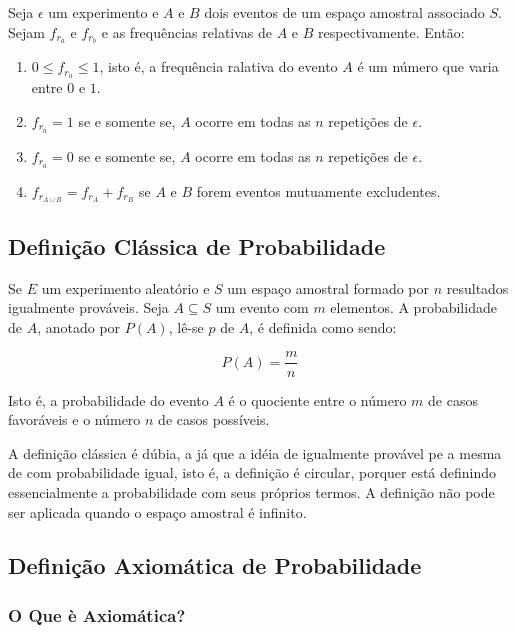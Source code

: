 \inic Seja $\epsilon$ um experimento e $A$ e $B$ dois eventos de um espaço amostral associado $S$. Sejam $f_{r}_{a}$ e $f_{r}_{b}$ e as frequências relativas de $A$ e $B$ respectivamente. Então:

\begin{enumerate}
    \item $0 \leqslant f_{r_{a}}  \leqslant 1$, isto é, a frequência ralativa do evento $A$ é um número que varia entre $0$ e $1$.
    \item $f_{r_{a}}= 1$ se e somente se, $A$ ocorre em todas as $n$ repetições de $\epsilon$.
    \item $f_{r_{a}}= 0$ se e somente se, $A$ ocorre em todas as $n$ repetições de $\epsilon$.
    \item $f_{r_{A \cup B}}  = f_{r_{A}} + f_{r_{B}}$ se $A$ e $B$ forem eventos mutuamente excludentes.
\end{enumerate}
 
 
 
 
 
\subsection{Definição Clássica de Probabilidade}
 
\inic Se $E$ um experimento aleatório e $S$ um espaço amostral formado por $n$ resultados igualmente prováveis. Seja $A \subseteq S$ um evento com $m$ elementos. A probabilidade de $A$, anotado por $P(A)$, lê-se $p$ de $A$, é definida como sendo:
  
\begin{equation}
     P(A)= \frac{m}{n}
\end{equation}
  
\inic Isto é, a probabilidade do evento $A$ é o quociente entre o número $m$ de casos favoráveis e o número $n$ de casos possíveis.\vskip0.3cm


\inic A definição clássica é dúbia, a já que a idéia de igualmente provável pe a mesma de com probabilidade igual, isto é, a definição é circular, porquer está definindo essencialmente a probabilidade com seus próprios termos. A definição não pode ser aplicada quando o espaço amostral é infinito.


 
\subsection{Definição Axiomática de Probabilidade}
\subsubsection{O Que è Axiomática?}

